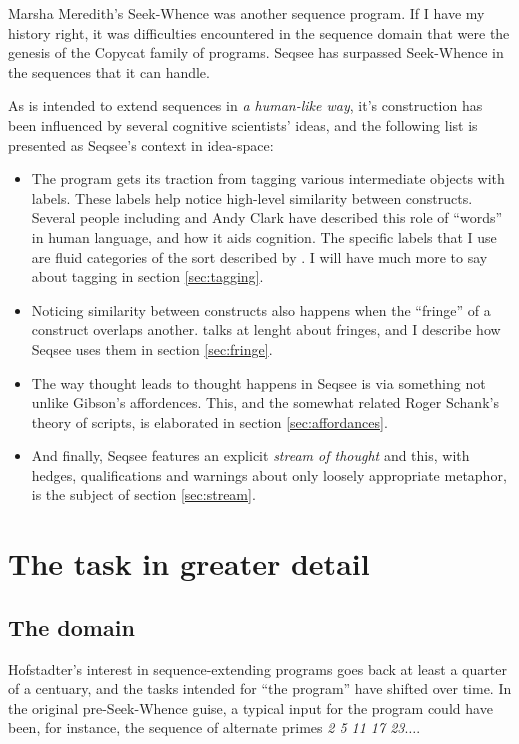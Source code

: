 \documentclass[letterpaper]{article}
\begin{document}
Marsha Meredith's Seek-Whence \cite{Meredith} was another sequence program. If I have my history right, it was difficulties encountered in the sequence domain that were the genesis of the Copycat family of programs. Seqsee has surpassed Seek-Whence in the sequences that it can handle.

As \seq is intended to extend sequences in \emph{a human-like way}, it's construction has been influenced by several cognitive scientists' ideas, and the following list is presented as Seqsee's context in idea-space:

\begin{itemize}
\item The program gets its traction from tagging various intermediate objects with labels. These labels help \seq notice high-level similarity between constructs. Several people including  and Andy Clark \cite{Clark:MindWare,Clark:MagicWords} have described this role of ``words'' in human language, and how it aids cognition. The specific labels that I use are fluid categories of the sort described by \hof.
I will have much more to say about tagging in section \ref{sec:tagging}.

\item Noticing similarity between constructs also happens when the ``fringe'' of a construct overlaps another.  talks at lenght about fringes, and I describe how Seqsee uses them in section \ref{sec:fringe}. 

\item The way thought leads to thought happens in Seqsee is via something not unlike Gibson's affordences.  This, and the somewhat related Roger Schank's theory of scripts, is elaborated in section \ref{sec:affordances}.

\item And finally, Seqsee features an explicit \emph{stream of thought} \cite{James} and this, with hedges, qualifications and warnings about only loosely appropriate metaphor, is the subject of section \ref{sec:stream}.
\end{itemize}

\section{The task in greater detail}
\label{sec:task}


\subsection{The domain}
\label{sec:domain}
Hofstadter's interest in sequence-extending programs goes back at least a quarter of a centuary, and the tasks intended for ``the program'' have shifted over time. In the original pre-Seek-Whence guise, a typical input for the program could have been, for instance, the sequence of alternate primes \emph{2 5 11 17 23$\ldots$}.
\end{document}
